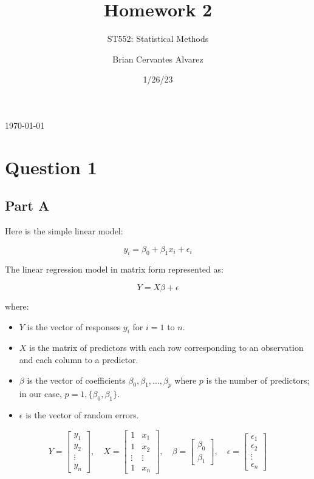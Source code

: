\documentclass[
  letterpaper,
  DIV=11,
  numbers=noendperiod]{scrartcl}
\title{Homework 2}
\subtitle{ST552: Statistical Methods}
\author{Brian Cervantes Alvarez}
\date{1/26/23}
\makeatletter
\providecommand{\tightlist}{%
  \setlength{\itemsep}{0pt}\setlength{\parskip}{0pt}}\usepackage{longtable,booktabs,array}
\renewcommand{\maketitle}{\bgroup\setlength{\parindent}{0pt}
\begin{flushleft}
  {\sffamily\fontsize{28}{5}\textbf{\capitalisewords{\@title}}} \vspace{0.3cm} \newline
  {\large\@author} \newline
  {\large\today} \newline %
  {\large {\@subtitle}} \vspace{-0.3cm}
\end{flushleft}\egroup
}
\makeatother
\begin{document}
\maketitle
\ifdefined\Shaded\renewenvironment{Shaded}{\begin{tcolorbox}[enhanced, boxrule=0pt, breakable, borderline west={3pt}{0pt}{shadecolor}, interior hidden, frame hidden, sharp corners]}{\end{tcolorbox}}\fi

\hypertarget{question-1}{%
\section{Question 1}\label{question-1}}

\hypertarget{part-a}{%
\subsection{Part A}\label{part-a}}

Here is the simple linear model:

\[y_i = \beta_0 + \beta_{1}x_i + \epsilon_i\]

The linear regression model in matrix form represented as:

\[ Y = X\beta + \epsilon \]

where:

\begin{itemize}
\tightlist
\item
  \(Y\) is the vector of responses \(y_i\) for \(i = 1\) to \(n\).
\item
  \(X\) is the matrix of predictors with each row corresponding to an
  observation and each column to a predictor.
\item
  \(\beta\) is the vector of coefficients
  \(\beta_0, \beta_1, ..., \beta_p\) where \(p\) is the number of
  predictors; in our case, \(p = 1, \{\beta_0, \beta_1\}\).
\item
  \(\epsilon\) is the vector of random errors.
\end{itemize}

\[ Y = \begin{bmatrix} y_1 \\ y_2 \\ \vdots \\ y_n \end{bmatrix}, \quad X = \begin{bmatrix} 1 & x_1 \\ 1 & x_2 \\ \vdots & \vdots \\ 1 & x_n \end{bmatrix}, \quad \beta = \begin{bmatrix} \beta_0 \\ \beta_1 \end{bmatrix}, \quad \epsilon = \begin{bmatrix} \epsilon_1 \\ \epsilon_2 \\ \vdots \\ \epsilon_n \end{bmatrix} \]
\end{document}
